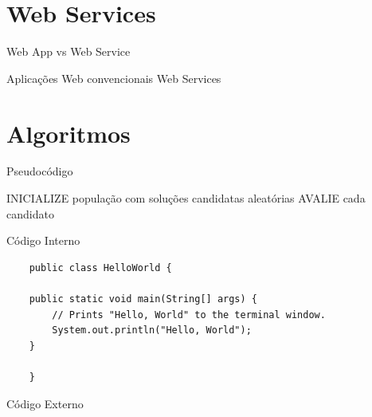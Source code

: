 \documentclass{beamer}
\begin{document}
\section{Web Services}

\begin{frame}{Web App vs Web Service}
  \begin{outline}
     Aplicações Web convencionais
  \0 \visible<1->{\resizebox{!}{1in}{}}
     Web Services
  \0 
  \end{outline}
\end{frame}

\section{Algoritmos}

\begin{frame}{Pseudocódigo}
  \begin{algorithm2e}[H]
    \DontPrintSemicolon
    \LinesNumbered
    \SetAlgoLined
    \BlankLine
    \BlankLine
    INICIALIZE população com soluções candidatas aleatórias\;
    AVALIE cada candidato\;
  \caption{Pseudocódigo de Algoritmos Evolucionários \label {alg:pseudocodigoAlgoritmosEvolucionarios}}
  \end{algorithm2e}
\end{frame}

\begin{frame}[fragile]{Código Interno}
  \begin{verbatim}
    public class HelloWorld {

	public static void main(String[] args) {
	    // Prints "Hello, World" to the terminal window.
	    System.out.println("Hello, World");
	}

    }
  \end{verbatim}
\end{frame}

\begin{frame}[fragile]{Código Externo}
  \inputminted[fontsize=\tiny]{groovy}{cod/Periodo.groovy}
\end{frame}
\end{document}
